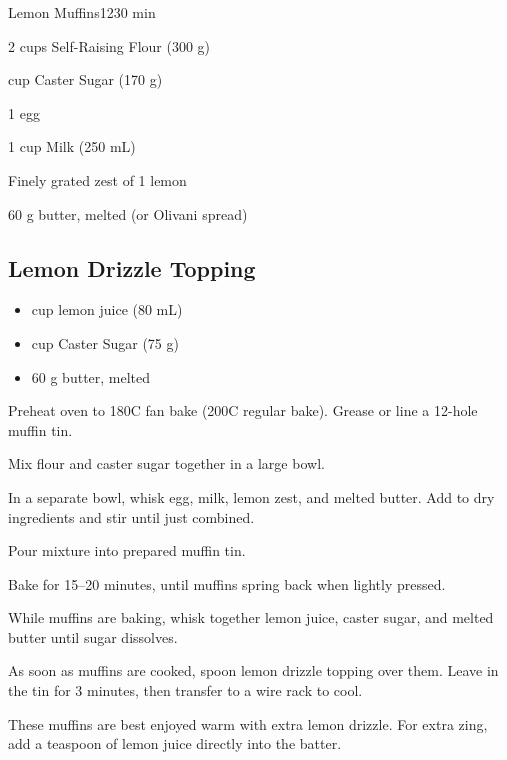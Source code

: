 \begin{recipebox}{Lemon Muffins}{12}{30 min}
\begin{ingredients}
  \item 2 cups Self-Raising Flour (300 g)
  \item {} cup Caster Sugar (170 g)
  \item 1 egg
  \item 1 cup Milk (250 mL)
  \item Finely grated zest of 1 lemon
  \item 60 g butter, melted (or Olivani spread)
\end{ingredients}

\subsection*{Lemon Drizzle Topping}
\begin{itemize}[leftmargin=2em]
  \item {} cup lemon juice (80 mL)
  \item {} cup Caster Sugar (75 g)
  \item 60 g butter, melted
\end{itemize}

\begin{method}
  \item Preheat oven to 180\degree C fan bake (200\degree C regular bake). Grease or line a 12-hole muffin tin.
  \item Mix flour and caster sugar together in a large bowl.
  \item In a separate bowl, whisk egg, milk, lemon zest, and melted butter. Add to dry ingredients and stir until just combined.
  \item Pour mixture into prepared muffin tin.
  \item Bake for 15–20 minutes, until muffins spring back when lightly pressed.
  \item While muffins are baking, whisk together lemon juice, caster sugar, and melted butter until sugar dissolves.
  \item As soon as muffins are cooked, spoon lemon drizzle topping over them. Leave in the tin for 3 minutes, then transfer to a wire rack to cool.
\end{method}

\begin{notes}
These muffins are best enjoyed warm with extra lemon drizzle.  
For extra zing, add a teaspoon of lemon juice directly into the batter.  
\end{notes}
\end{recipebox}

